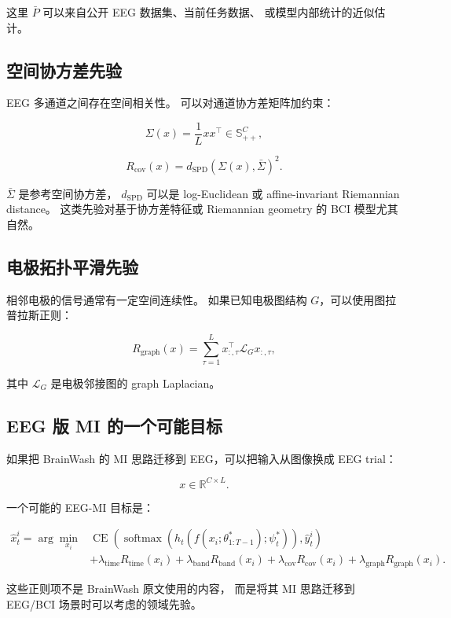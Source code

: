 \documentclass[11pt]{article}
\begin{document}
这里 \(\bar{P}\) 可以来自公开 EEG 数据集、当前任务数据、
或模型内部统计的近似估计。

\subsection{空间协方差先验}

EEG 多通道之间存在空间相关性。
可以对通道协方差矩阵加约束：

\[
\Sigma(x)
=
\frac{1}{L}
xx^\top
\in
\mathbb{S}_{++}^{C},
\]

\[
R_{\mathrm{cov}}(x)
=
d_{\mathrm{SPD}}
\left(
\Sigma(x),\bar{\Sigma}
\right)^2.
\]

\(\bar{\Sigma}\) 是参考空间协方差，
\(d_{\mathrm{SPD}}\) 可以是 log-Euclidean 或 affine-invariant Riemannian distance。
这类先验对基于协方差特征或 Riemannian geometry 的 BCI 模型尤其自然。

\subsection{电极拓扑平滑先验}

相邻电极的信号通常有一定空间连续性。
如果已知电极图结构 \(G\)，可以使用图拉普拉斯正则：

\[
R_{\mathrm{graph}}(x)
=
\sum_{\tau=1}^{L}
x_{:,\tau}^{\top}
\mathcal{L}_G
x_{:,\tau},
\]

其中 \(\mathcal{L}_G\) 是电极邻接图的 graph Laplacian。

\subsection{EEG 版 MI 的一个可能目标}

如果把 BrainWash 的 MI 思路迁移到 EEG，可以把输入从图像换成 EEG trial：

\[
x\in\mathbb{R}^{C\times L}.
\]

一个可能的 EEG-MI 目标是：

\[
\begin{aligned}
\hat{x}_t^i
=
\arg\min_{x_i}
&
\operatorname{CE}
\left(
\operatorname{softmax}
\left(
h_t(f(x_i;\theta_{1:T-1}^{*});\psi_t^{*})
\right),
\hat{y}_t^i
\right)\\
&+
\lambda_{\mathrm{time}}R_{\mathrm{time}}(x_i)
+
\lambda_{\mathrm{band}}R_{\mathrm{band}}(x_i)
+
\lambda_{\mathrm{cov}}R_{\mathrm{cov}}(x_i)
+
\lambda_{\mathrm{graph}}R_{\mathrm{graph}}(x_i).
\end{aligned}
\]

这些正则项不是 BrainWash 原文使用的内容，
而是将其 MI 思路迁移到 EEG/BCI 场景时可以考虑的领域先验。
\end{document}
